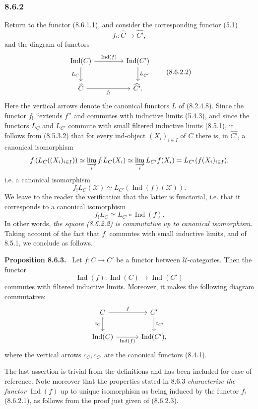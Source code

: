 \documentclass[11pt]{article}
\newcommand{\U}{\mathcal{U}}
\newcommand{\Ind}{\operatorname{Ind}}
\newenvironment{statement}[1]{\par\medskip\noindent\textbf{#1.}\ }{\par\medskip}
\begin{document}
\subsubsection*{8.6.2}
Return to the functor (8.6.1.1), and consider the corresponding functor (5.1)
\[
f_!:\widehat C\longrightarrow\widehat{C'},
\tag{8.6.2.1}
\]
and the diagram of functors
\[
\begin{tikzcd}[column sep=4.2em,row sep=2.0em]
\Ind(C) \arrow[r,"{\Ind(f)}"] \arrow[d,"{L_C}"'] & \Ind(C') \arrow[d,"{L_{C'}}"] \\
\widehat C \arrow[r,"{f_!}"'] & \widehat{C'}.
\end{tikzcd}
\tag{8.6.2.2}
\]
Here the vertical arrows denote the canonical functors $L$ of (8.2.4.8). Since the functor $f_!$ ``extends $f$'' and commutes with inductive limits (5.4.3), and since the functors $L_C$ and $L_{C'}$ commute with small filtered inductive limits (8.5.1), it follows from (8.5.3.2) that for every ind-object $(X_i)_{i\in I}$ of $C$ there is, in $\widehat{C'}$, a canonical isomorphism
\[
f_!(L_C((X_i)_{i\in I}))\simeq \varinjlim_i f_!L_C(X_i)
\simeq \varinjlim_i L_{C'}f(X_i)=L_{C'}(f(X_i)_{i\in I}),
\]
i.e. a canonical isomorphism
\[
f_!L_C(\mathcal X)\simeq L_{C'}(\Ind(f)(\mathcal X)).
\]
We leave to the reader the verification that the latter is functorial, i.e. that it corresponds to a canonical isomorphism
\[
f_!L_C\simeq L_{C'}\circ\Ind(f).
\tag{8.6.2.3}
\]
In other words, \emph{the square (8.6.2.2) is commutative up to canonical isomorphism}. Taking account of the fact that $f_!$ commutes with small inductive limits, and of 8.5.1, we conclude as follows.

\begin{statement}{Proposition 8.6.3}
Let $f:C\to C'$ be a functor between $\U$-categories. Then the functor
\[
\Ind(f):\Ind(C)\longrightarrow\Ind(C')
\]
commutes with filtered inductive limits. Moreover, it makes the following diagram commutative:
\[
\begin{tikzcd}[column sep=3.2em,row sep=2.0em]
C \arrow[r,"f"] \arrow[d,"{c_C}"'] & C' \arrow[d,"{c_{C'}}"] \\
\Ind(C) \arrow[r,"{\Ind(f)}"'] & \Ind(C'),
\end{tikzcd}
\]
where the vertical arrows $c_C,c_{C'}$ are the canonical functors (8.4.1).
\end{statement}

The last assertion is trivial from the definitions and has been included for ease of reference. Note moreover that the properties stated in 8.6.3 \emph{characterize the functor} $\Ind(f)$ up to unique isomorphism as being induced by the functor $f_!$ (8.6.2.1), as follows from the proof just given of (8.6.2.3).
\end{document}

